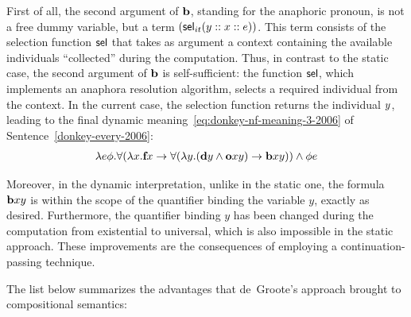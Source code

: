 
First of all, the second argument of $\textbf{b}$, standing for the anaphoric pronoun, is not a free dummy variable, but a term $( \sel_{it} (\y1 :: \x1 :: e))$. This term consists of the selection function $\mathsf{sel}$ that takes as argument a context containing the available individuals ``collected'' during the computation. Thus, in contrast to the static case, the second argument of $\textbf{b}$ is self-sufficient: the function $\mathsf{sel}$, which implements an anaphora resolution algorithm, selects a required individual from the context. In the current case, the selection function returns the individual $\y1$, leading to the final dynamic meaning~\eqref{eq:donkey-nf-meaning-3-2006} of Sentence~\eqref{donkey-every-2006}:
\begin{align}
\lambda e \phi. \forall ( \lambda \x1.  \cfarmer \x1  \rightarrow    \forall ( \lambda \y1.  ( \cdonkey \y1 \land  \cown \x1 \y1 ) \rightarrow   \cbeat \x1 \y1  ) )  \land \phi e  \label{eq:donkey-nf-meaning-3-2006}
\end{align}

Moreover, in the dynamic interpretation, unlike in the static one, the formula $\cbeat \x1 \y1 $ is within the scope of the quantifier binding the variable $y$, exactly as desired.  Furthermore, the quantifier binding $y$ has been changed during the computation from existential to universal, which is also impossible in the static approach. These improvements are the consequences of employing a continuation-passing technique. 

The list below summarizes the advantages that de~Groote's approach brought to compositional semantics:


